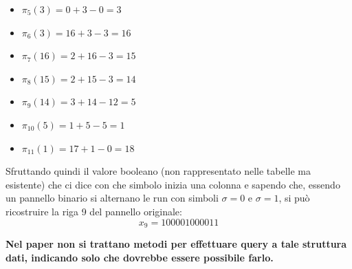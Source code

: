 \begin{esempio}
\begin{multicols}{2}
\begin{itemize}
      \item $\pi_5(3)=0+3-0=3$
      \item $\pi_6(3)=16+3-3=16$
      \item $\pi_7(16)=2+16-3=15$
      \item $\pi_8(15)=2+15-3=14$
      \item $\pi_9(14)=3+14-12=5$
      \item $\pi_{10}(5)=1+5-5=1$
      \item $\pi_{11}(1)=17+1-0=18$
    \end{itemize}
  \end{multicols}
  Sfruttando quindi il valore booleano (non rappresentato nelle tabelle ma
  esistente) che ci dice con che simbolo inizia una colonna e sapendo che,
  essendo un pannello binario si alternano le run con simboli $\sigma=0$ e
  $\sigma=1$, si può ricostruire la riga 9 del pannello originale:
  \[x_9=100001000011\]
\end{esempio}
\textbf{Nel paper non si trattano metodi per effettuare query a tale struttura
  dati, indicando solo che dovrebbe essere possibile farlo.}